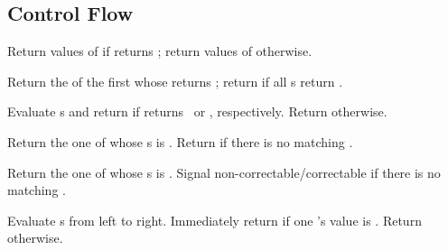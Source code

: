 \subsection{Control Flow}
\begin{LIST}{1cm}

  {
    Return values of  if  returns \T;
    return values of  otherwise.
  }

  {
    Return the  of the first  whose
     returns \T; return \retval{\NIL} if all s
    return \NIL.
  }

  {
    Evaluate s and return  if 
    returns \T\ or \NIL, respectively. Return \retval{\NIL} otherwise.
  }

  {
    Return the  one of
    whose s is  . Return  if there is no matching .
  }

  {
    Return the  one of
    whose s is  .  Signal
    non-correctable/correctable  if there is no
    matching .
  }

  {
    Evaluate s from left to right. Immediately return
    \retval{\NIL} if one 's value is \NIL. Return
     otherwise.
  }


\end{LIST}
